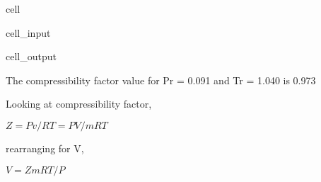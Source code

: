 \documentclass[letterpaper,10pt,english]{jupyterBook}
\begin{document}
\begin{sphinxuseclass}{cell}
\begin{sphinxVerbatimInput}
\begin{sphinxuseclass}{cell_input}
\end{sphinxuseclass}\end{sphinxVerbatimInput}
\begin{sphinxVerbatimOutput}

\begin{sphinxuseclass}{cell_output}
\begin{sphinxVerbatim}[commandchars=\\\{\}]
The compressibility factor value for P\PYGZus{}r = 0.091 and T\PYGZus{}r = 1.040 is 0.973
\end{sphinxVerbatim}

\end{sphinxuseclass}\end{sphinxVerbatimOutput}

\end{sphinxuseclass}
\sphinxAtStartPar
Looking at compressibility factor,

\sphinxAtStartPar
\(Z=Pv/RT=PV/mRT\)

\sphinxAtStartPar
rearranging for V,

\sphinxAtStartPar
\(V=ZmRT/P\)
\end{document}
